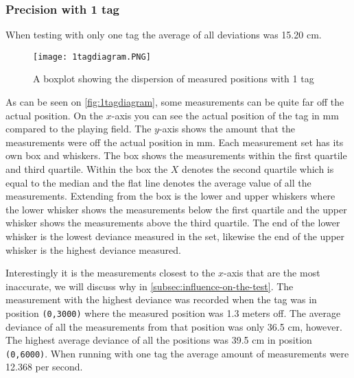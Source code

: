 \subsubsection{Precision with 1 tag} 
When testing with only one tag the average of all deviations was 15.20 cm.
\begin{figure}[H]
    \centering
    \texttt{[image: 1tagdiagram.PNG]}
    \caption{A boxplot showing the dispersion of measured positions with 1 tag}
    \label{fig:1tagdiagram}
\end{figure}
\noindent
As can be seen on \autoref{fig:1tagdiagram}, some measurements can be quite far off the actual position. 
On the $x$-axis you can see the actual position of the tag in mm compared to the playing field.
The $y$-axis shows the amount that the measurements were off the actual position in mm.
Each measurement set has its own box and whiskers.
The box shows the measurements within the first quartile and third quartile.
Within the box the $X$ denotes the second quartile which is equal to the median and the flat line denotes the average value of all the measurements.
Extending from the box is the lower and upper whiskers where the lower whisker shows the measurements below the first quartile and the upper whisker shows the measurements above the third quartile.
The end of the lower whisker is the lowest deviance measured in the set, likewise the end of the upper whisker is the highest deviance measured.

Interestingly it is the measurements closest to the $x$-axis that are the most inaccurate, we will discuss why in \autoref{subsec:influence-on-the-test}.
The measurement with the highest deviance was recorded when the tag was in position \texttt{(0,3000)} where the measured position was 1.3 meters off.
The average deviance of all the measurements from that position was only 36.5 cm, however.
The highest average deviance of all the positions was 39.5 cm in position \texttt{(0,6000)}.
When running with one tag the average amount of measurements were 12.368 per second.
 

